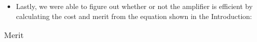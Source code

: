\begin{itemize}
	\item Lastly, we were able to figure out whether or not the amplifier is efficient by calculating the cost and merit from the equation shown in the Introduction:
\end{itemize}

\begin{table}[H]
  \centering
  \begin{tabular}{|c|c|}
    \hline    
    
  \end{tabular}
  \caption{Merit}
  \label{sim1}
\end{table}



























